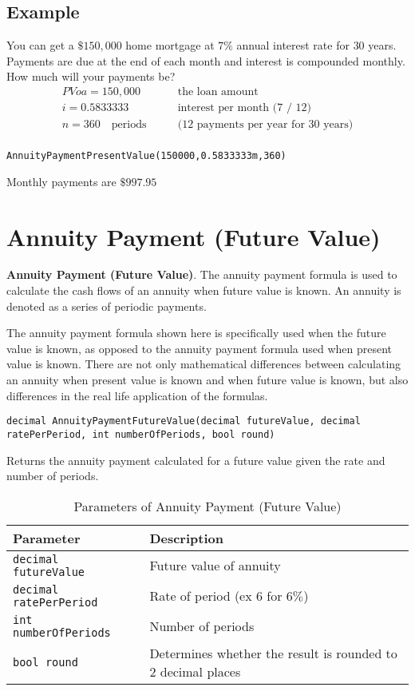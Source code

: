 \subsection{Example}
You can get a $\$150,000$ home mortgage at $7\%$ annual interest rate for $30$ years. Payments are due at the end of each month and interest is compounded monthly. How much will your payments be?
\begin{align*}
PVoa = 150,000 \qquad &\text{the loan amount} \\
i =  0.5833333 \qquad &\text{interest per month (7 / 12)}\\
n = 360\quad \text{periods} \qquad  &\text{(12 payments per year for 30 years)} \\
\end{align*}
\begin{lstlisting}
AnnuityPaymentPresentValue(150000,0.5833333m,360)
\end{lstlisting}
Monthly payments are $\$997.95$






\section{Annuity Payment (Future Value)}
\textbf{Annuity Payment (Future Value)}. The annuity payment formula is used to calculate the cash flows of an annuity when future value is known. An annuity is denoted as a series of periodic payments.

The annuity payment formula shown here is specifically used when the future value is known, as opposed to the annuity payment formula used when present value is known. There are not only mathematical differences between calculating an annuity when present value is known and when future value is known, but also differences in the real life application of the formulas.
\begin{lstlisting}
decimal AnnuityPaymentFutureValue(decimal futureValue, decimal ratePerPeriod, int numberOfPeriods, bool round)
\end{lstlisting}
Returns the annuity payment calculated for a future value given the rate and number of periods.

\begin{table}[h]
\begin{tabular}{|l|l|}
\hline
\textbf{Parameter} & \textbf{Description}\\
\hline
\verb|decimal futureValue| & Future value of annuity\\
\verb|decimal ratePerPeriod| & Rate of period (ex $6$ for $6\%$)\\
\verb|int numberOfPeriods| & Number of periods\\
\verb|bool round| & Determines whether the result is rounded to $2$ decimal places\\
\hline
\end{tabular}
\caption{Parameters of Annuity Payment (Future Value)}
\end{table}


